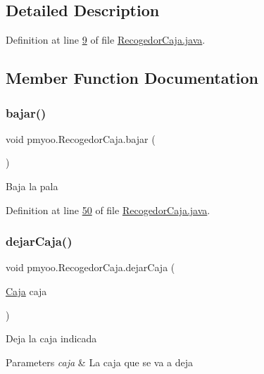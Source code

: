 \subsection{Detailed Description}


Definition at line \mbox{\hyperlink{_recogedor_caja_8java_source_l00009}{9}} of file \mbox{\hyperlink{_recogedor_caja_8java_source}{Recogedor\+Caja.\+java}}.



\subsection{Member Function Documentation}
\mbox{\label{classpmyoo_1_1_recogedor_caja_ae7bc7adbd886765db7c73c4c5a1223e8}} 
\subsubsection{\texorpdfstring{bajar()}{bajar()}}
{\footnotesize\ttfamily void pmyoo.\+Recogedor\+Caja.\+bajar (\begin{DoxyParamCaption}{ }\end{DoxyParamCaption})}

Baja la pala 

Definition at line \mbox{\hyperlink{_recogedor_caja_8java_source_l00050}{50}} of file \mbox{\hyperlink{_recogedor_caja_8java_source}{Recogedor\+Caja.\+java}}.

\mbox{\label{classpmyoo_1_1_recogedor_caja_abe6a643d0dfe800a62ca5887454adf5a}} 
\subsubsection{\texorpdfstring{dejarCaja()}{dejarCaja()}}
{\footnotesize\ttfamily void pmyoo.\+Recogedor\+Caja.\+dejar\+Caja (\begin{DoxyParamCaption}\item[{\mbox{\hyperlink{classpmyoo_1_1_caja}{Caja}}}]{caja }\end{DoxyParamCaption})}

Deja la caja indicada 
\begin{DoxyParams}{Parameters}
{\em caja} & La caja que se va a deja \\
\hline
\end{DoxyParams}


